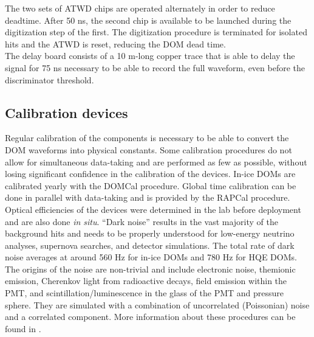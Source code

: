 The two sets of ATWD chips are operated alternately in order to reduce deadtime. After 50 ns, the second chip is available to be launched during the digitization step of the first. The digitization procedure is terminated for isolated hits and the ATWD is reset, reducing the DOM dead time.\\

The delay board consists of a 10 m-long copper trace that is able to delay the signal for 75 ns necessary to be able to record the full waveform, even before the discriminator threshold.

\subsection{Calibration devices}
\label{subsec:calibration}
Regular calibration of the components is necessary to be able to convert the DOM waveforms into physical constants. Some calibration procedures do not allow for simultaneous data-taking and are performed as few as possible, without losing significant confidence in the calibration of the devices. In-ice DOMs are calibrated yearly with the DOMCal procedure. Global time calibration can be done in parallel with data-taking and is provided by the RAPCal procedure. Optical efficiencies of the devices were determined in the lab before deployment and are also done \textit{in situ}. ``Dark noise'' results in the vast majority of the background hits and needs to be properly understood for low-energy neutrino analyses, supernova searches, and detector simulations. The total rate of dark noise averages at around 560 Hz for in-ice DOMs and 780 Hz for HQE DOMs. The origins of the noise are non-trivial and include electronic noise, themionic emission, Cherenkov light from radioactive decays, field emission within the PMT, and scintillation/luminescence in the glass of the PMT and pressure sphere. They are simulated with a combination of uncorrelated (Poissonian) noise and a correlated component. More information about these procedures can be found in \cite{Aartsen:2016nxy}.

